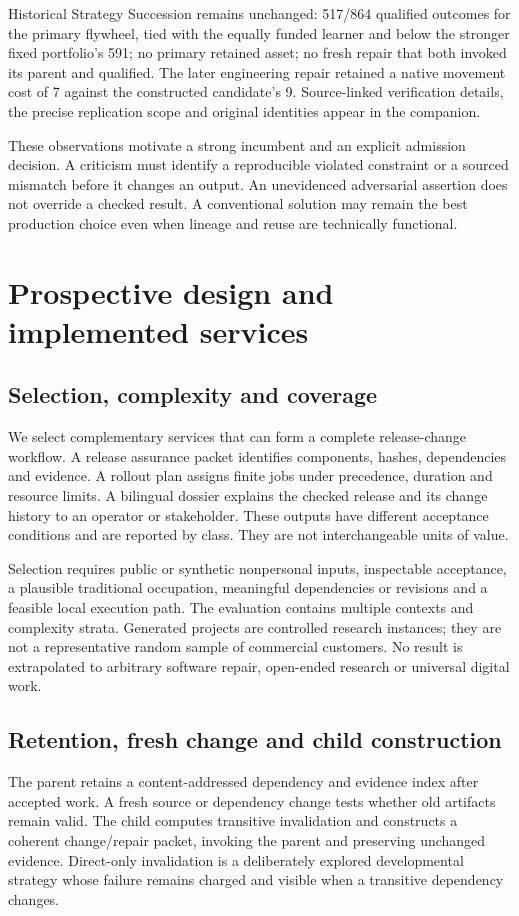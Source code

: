 \documentclass[11pt,a4paper]{article}
\begin{document}
Historical Strategy Succession remains unchanged: 517/864 qualified outcomes for the primary flywheel, tied with the equally funded learner and below the stronger fixed portfolio's 591; no primary retained asset; no fresh repair that both invoked its parent and qualified. The later engineering repair retained a native movement cost of 7 against the constructed candidate's 9. Source-linked verification details, the precise replication scope and original identities appear in the companion.\citep{strategy_results,strategy_worker}

These observations motivate a strong incumbent and an explicit admission decision. A criticism must identify a reproducible violated constraint or a sourced mismatch before it changes an output. An unevidenced adversarial assertion does not override a checked result. A conventional solution may remain the best production choice even when lineage and reuse are technically functional.

\section{Prospective design and implemented services}
\label{sec:design}
\subsection{Selection, complexity and coverage}
We select complementary services that can form a complete release-change workflow. A release assurance packet identifies components, hashes, dependencies and evidence. A rollout plan assigns finite jobs under precedence, duration and resource limits. A bilingual dossier explains the checked release and its change history to an operator or stakeholder. These outputs have different acceptance conditions and are reported by class. They are not interchangeable units of value.

Selection requires public or synthetic nonpersonal inputs, inspectable acceptance, a plausible traditional occupation, meaningful dependencies or revisions and a feasible local execution path. The evaluation contains multiple contexts and complexity strata. Generated projects are controlled research instances; they are not a representative random sample of commercial customers. No result is extrapolated to arbitrary software repair, open-ended research or universal digital work.



\subsection{Retention, fresh change and child construction}
The parent retains a content-addressed dependency and evidence index after accepted work. A fresh source or dependency change tests whether old artifacts remain valid. The child computes transitive invalidation and constructs a coherent change/repair packet, invoking the parent and preserving unchanged evidence. Direct-only invalidation is a deliberately explored developmental strategy whose failure remains charged and visible when a transitive dependency changes.
\end{document}
